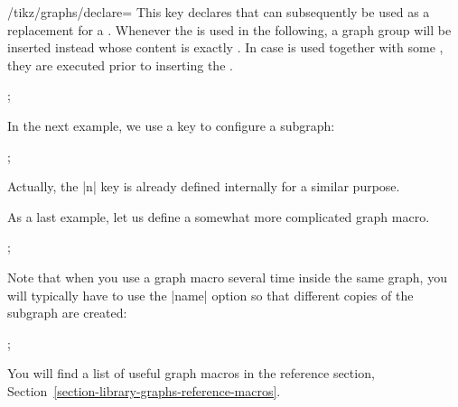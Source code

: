 \begin{key}{/tikz/graphs/declare=}
    This key declares that  can subsequently be used as a
    replacement for a . Whenever the  is used
    in the following, a graph group will be inserted instead whose content is
    exactly . In case  is used together
    with some , they are executed prior to inserting the
    .
\begin{codeexample}[]
\tikz {};
\end{codeexample}
    In the next example, we use a key to configure a subgraph:
\begin{codeexample}[]
\tikz {};
\end{codeexample}
    Actually, the |n| key is already defined internally for a similar purpose.

    As a last example, let us define a somewhat more complicated graph macro.
\begin{codeexample}[]
\newcount\mycount
{}
\tikz {};
\end{codeexample}
\end{key}

Note that when you use a graph macro several time inside the same graph, you
will typically have to use the |name| option so that different copies of the
subgraph are created:
%
\begin{codeexample}[]
\tikz {};
\end{codeexample}

You will find a list of useful graph macros in the reference section,
Section~\ref{section-library-graphs-reference-macros}.



